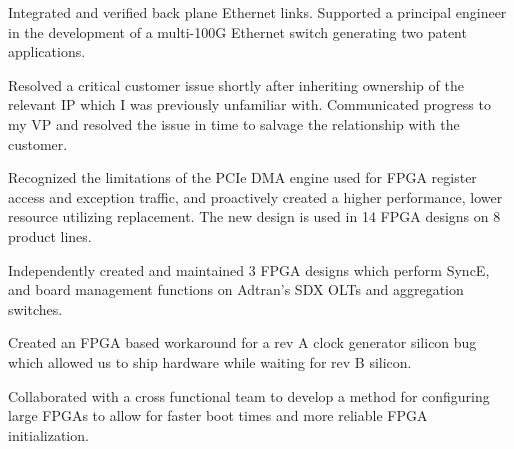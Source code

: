 \documentclass[10pt]{deedy-resume-reversed}
\begin{document}
\begin{minipage}[t]{1.0\textwidth}
\begin{tightemize}
Integrated and verified back plane Ethernet links.
Supported a principal engineer in the development of a multi-100G Ethernet switch generating two patent applications.
\item Resolved a critical customer issue shortly after inheriting ownership of the relevant IP which I was previously unfamiliar with. 
Communicated progress to my VP and resolved the issue in time to salvage the relationship with the customer.
\item Recognized the limitations of the PCIe DMA engine used for FPGA register access and exception traffic, 
and proactively created a higher performance, lower resource utilizing replacement. The new design is used in 14 FPGA designs on 8 product lines.
\item Independently created and maintained 3 FPGA designs which perform SyncE, and board management functions on Adtran's SDX OLTs and aggregation switches. 
\item Created an FPGA based workaround for a rev A clock generator silicon bug which allowed us to ship hardware while waiting for rev B silicon.
\item Collaborated with a cross functional team to develop a method for configuring large FPGAs to allow for faster boot times and more reliable FPGA initialization.
\end{tightemize}
\sectionsep


\end{minipage}
\end{document}
